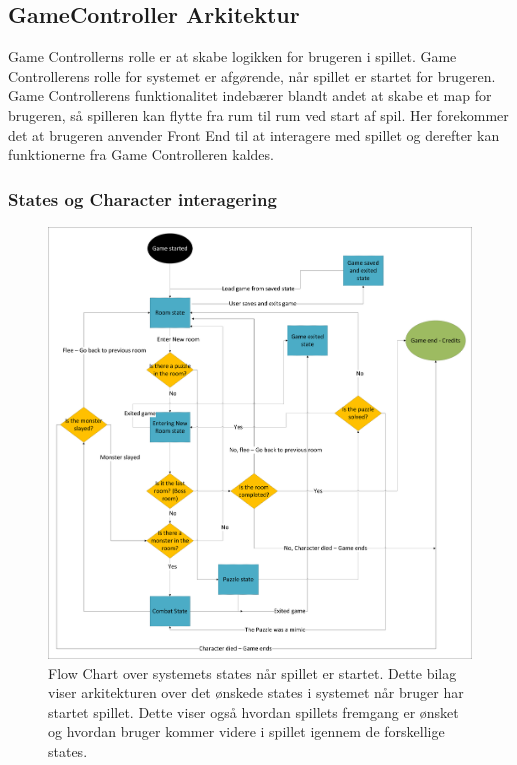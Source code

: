 \subsection{GameController Arkitektur}
Game Controllerns rolle er at skabe logikken for brugeren i spillet. Game Controllerens rolle for systemet er afgørende, når spillet er startet for brugeren. Game Controllerens funktionalitet indebærer blandt andet at skabe et map for brugeren, så spilleren kan flytte fra rum til rum ved start af spil. Her forekommer det at brugeren anvender Front End til at interagere med spillet og derefter kan funktionerne fra Game Controlleren kaldes.
\subsubsection{States og Character interagering}
\begin{figure}[H]
\centering
\includegraphics[width = \textwidth]{02-Body/Images/Arkitektur - State Logic.pdf}
\caption{Flow Chart over systemets states når spillet er startet. Dette bilag viser arkitekturen over det ønskede states i systemet når bruger har startet spillet. Dette viser også hvordan spillets fremgang er ønsket og hvordan bruger kommer videre i spillet igennem de forskellige states.}
\label{fig:Arkitektur-SD-SaveGame}
\end{figure}
